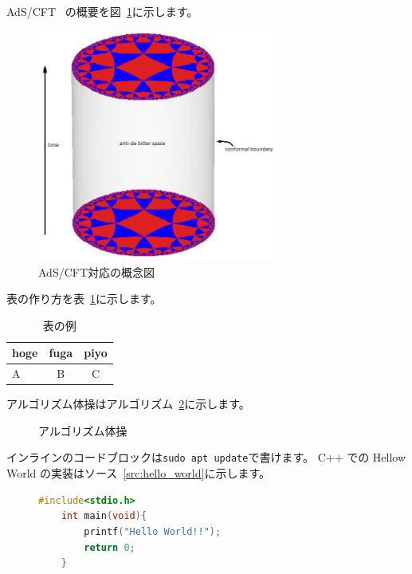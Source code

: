 \documentclass[a4paper,10pt]{ltjsarticle}
\begin{document}
AdS/CFT~\cite{maldacena1999large}
の概要を図~\ref{fig:adscft}に示します。
\begin{figure}[tbp]
  \begin{center}
    \includegraphics[width=8cm]{img/sample.png}
    \caption{AdS/CFT対応の概念図~\cite{adscftwiki}}
  \end{center}
  \label{fig:adscft}
\end{figure}
表の作り方を表~\ref{tab:sample}に示します。
\begin{table}[tbp]
  \begin{center}
    \caption{表の例}\label{tab:sample}
    \begin{tabular}{lcc}
      \toprule
      hoge & fuga & piyo \\
      \midrule
      A    & B    & C    \\
      \bottomrule
    \end{tabular}
  \end{center}
\end{table}
アルゴリズム体操はアルゴリズム~\ref{alg:excersise}に示します。
\begin{figure}[tbp]
  \begin{algorithm}[H]
    \caption{アルゴリズム体操}\label{alg:excersise}
    \begin{algorithmic}
      \EndFor
      \EndFunction
    \end{algorithmic}
  \end{algorithm}
\end{figure}
インラインのコードブロックは\lstinline|sudo apt update|で書けます。
C++ での Hellow World の実装はソース~\ref{src:hello_world}に示します。
\begin{figure}
  \begin{lstlisting}[caption=Hello World,label={src:hello_world},language=C]
    #include<stdio.h>
    int main(void){
        printf("Hello World!!");
        return 0;
    }
  \end{lstlisting}
\end{figure}

\newpage

\end{document}
